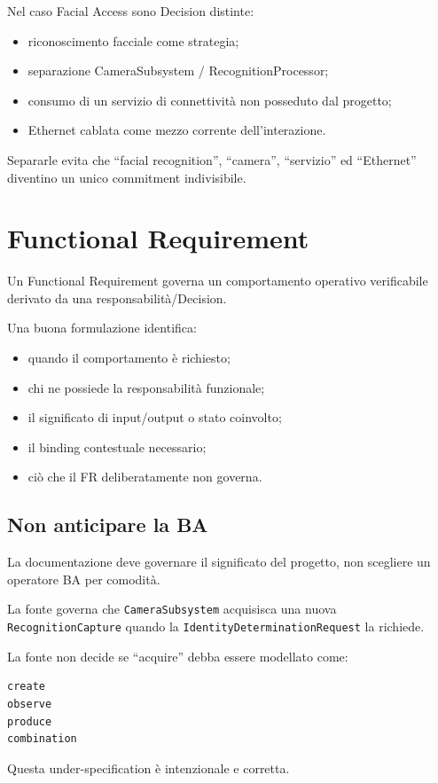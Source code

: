 \documentclass[11pt,a4paper]{article}
\newcommand{\code}[1]{\nolinkurl{#1}}
\begin{document}
\begin{examplebox}[D-3.1, D-3.4, D-3.5, D-3.6]
Nel caso Facial Access sono Decision distinte:
\begin{itemize}
\item riconoscimento facciale come strategia;
\item separazione CameraSubsystem / RecognitionProcessor;
\item consumo di un servizio di connettività non posseduto dal progetto;
\item Ethernet cablata come mezzo corrente dell'interazione.
\end{itemize}
Separarle evita che ``facial recognition'', ``camera'', ``servizio'' ed ``Ethernet'' diventino un unico commitment indivisibile.
\end{examplebox}

\section{Functional Requirement}

Un Functional Requirement governa un comportamento operativo verificabile derivato da una responsabilità/Decision.

Una buona formulazione identifica:

\begin{itemize}
\item quando il comportamento è richiesto;
\item chi ne possiede la responsabilità funzionale;
\item il significato di input/output o stato coinvolto;
\item il binding contestuale necessario;
\item ciò che il FR deliberatamente non governa.
\end{itemize}

\subsection{Non anticipare la BA}

La documentazione deve governare il significato del progetto, non scegliere un operatore BA per comodità.

\begin{examplebox}[FR-3.4.1 - acquire]
La fonte governa che \code{CameraSubsystem} acquisisca una nuova \code{RecognitionCapture} quando la \code{IdentityDeterminationRequest} la richiede.

La fonte non decide se ``acquire'' debba essere modellato come:
\begin{lstlisting}
create
observe
produce
combination
\end{lstlisting}
Questa under-specification è intenzionale e corretta.
\end{examplebox}
\end{document}
